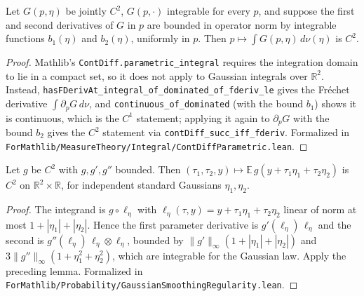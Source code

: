 \begin{lemma}\label{lem:sg-tal:perceptron-contdiff-parametric}
  \leanok
{}
Let $G(p,\eta)$ be jointly $C^2$, $G(p,\cdot)$ integrable for every $p$, and suppose the first and second derivatives of $G$ in $p$ are bounded in operator norm by integrable functions $b_1(\eta)$ and $b_2(\eta)$, uniformly in $p$. Then $p\mapsto\int G(p,\eta)\,d\nu(\eta)$ is $C^2$.
\end{lemma}
\begin{proof}
  \leanok
Mathlib's \texttt{ContDiff.parametric\_integral} requires the integration domain to lie in a compact set, so it does not apply to Gaussian integrals over $\mathbb R^2$. Instead, \texttt{hasFDerivAt\_integral\_of\_dominated\_of\_fderiv\_le} gives the Fr\'echet derivative $\int \partial_pG\,d\nu$, and \texttt{continuous\_of\_dominated} (with the bound $b_1$) shows it is continuous, which is the $C^1$ statement; applying it again to $\partial_pG$ with the bound $b_2$ gives the $C^2$ statement via \texttt{contDiff\_succ\_iff\_fderiv}.
Formalized in \texttt{ForMathlib/MeasureTheory/Integral/ContDiffParametric.lean}.
\end{proof}

\begin{lemma}\label{lem:sg-tal:perceptron-smoothing-regularity}
  \leanok
Let $g$ be $C^2$ with $g,g',g''$ bounded. Then $(\tau_1,\tau_2,y)\mapsto\mathbb E\,g(y+\tau_1\eta_1+\tau_2\eta_2)$ is $C^2$ on $\mathbb R^2\times\mathbb R$, for independent standard Gaussians $\eta_1,\eta_2$.
\end{lemma}
\begin{proof}
  \leanok
The integrand is $g\circ\ell_\eta$ with $\ell_\eta(\tau,y)=y+\tau_1\eta_1+\tau_2\eta_2$ linear of norm at most $1+|\eta_1|+|\eta_2|$. Hence the first parameter derivative is $g'(\ell_\eta)\,\ell_\eta$ and the second is $g''(\ell_\eta)\,\ell_\eta\otimes\ell_\eta$, bounded by $\|g'\|_\infty(1+|\eta_1|+|\eta_2|)$ and $3\|g''\|_\infty(1+\eta_1^2+\eta_2^2)$, which are integrable for the Gaussian law. Apply the preceding lemma.
Formalized in \texttt{ForMathlib/Probability/GaussianSmoothingRegularity.lean}.
\end{proof}


